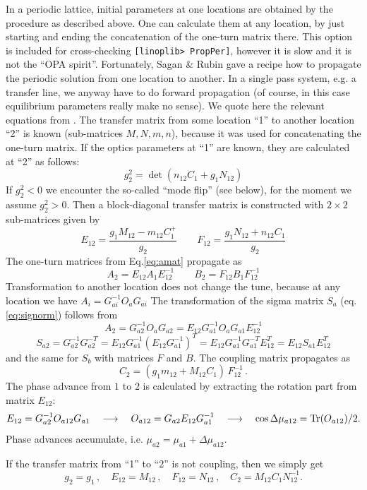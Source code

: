 \documentclass[12pt]{article}
\newcommand\beq{\begin{equation}}
\newcommand\eeq{\end{equation}}
\newcommand{\Tr}{{\rm Tr}}
\newcommand\code[1]{{\tt [#1]}}
\begin{document}
In a periodic lattice, initial parameters at one locations are obtained by the procedure as described above. One can calculate them at any location, by just starting and ending the concatenation of the one-turn matrix there. This option is included for cross-checking \code{linoplib> PropPer}, however it is slow and it is not the ``OPA spirit''.
Fortunately, Sagan \& Rubin gave a recipe \cite{SAGAN} how to propagate the periodic solution from one location to another.
In a single pass system, e.g. a transfer line, we anyway have to do forward propagation (of course, in this case equilibrium parameters really make no sense).
We quote here the relevant equations from \cite{SAGAN}. The transfer matrix from some location ``1'' to another location ``2'' is known (sub-matrices $M,N,m,n$), because it was used for concatenating the one-turn matrix. If the optics parameters at ``1'' are known, they are calculated at ``2'' as follows:
\beq\label{eq:g2noflip}
g_2^2=\det (n_{12} C_1+g_1 N_{12})
\eeq
If $g_2^2<0$ we encounter the so-called ``mode flip'' (see below), for the moment we assume $g_2^2>0$. Then a block-diagonal transfer matrix is constructed with $2\times 2$ sub-matrices given by
\beq
E_{12}=\frac{g_1M_{12}-m_{12}C_1^+}{g_2}\qquad
F_{12}=\frac{g_1N_{12}+n_{12}C_1}{g_2}
\eeq
The one-turn matrices from Eq.\ref{eq:amat} propagate as
\beq
A_2=E_{12}A_1 E_{12}^{-1}\qquad  B_2=F_{12}B_1 F_{12}^{-1}
\eeq
Transformation to another location does not change the tune, because at any location we have
$A_i = {G}_{ai}^{-1} {O}_a {G}_{ai}$
The transformation of the sigma matrix $S_a$ (eq.\ref{eq:signorm}) follows from
\beq
A_2 = {G}_{a2}^{-1} {O}_a {G}_{a2} = E_{12} {G}_{a1}^{-1} {O}_a {G}_{a1} E_{12}^{-1}
\eeq
\beq
S_{a2} =  {G}_{a2}^{-1} {G}_{a2}^{-T}
= E_{12} {G}_{a1}^{-1} (E_{12} {G}_{a1}^{-1})^T
=E_{12} {G}_{a1}^{-1} {G}_{a1}^{-T} E_{12}^T = E_{12} S_{a1} E_{12}^T
\eeq
and the same for $S_b$ with matrices $F$ and ${B}$.
The coupling matrix propagates as
\beq
C_2=(g_1m_{12}+M_{12}C_1)\,F_{12}^{-1}\, .
\eeq
The phase advance from $1$ to $2$ is calculated by extracting the rotation part from matrix $E_{12}$:
\beq
E_{12} = {G}_{a2}^{-1} {O}_{a12} {G}_{a1}\quad\longrightarrow\quad
{O}_{a12} = {G}_{a2} E_{12} {G}_{a1}^{-1} \quad\longrightarrow\quad \cos\Delta\mu_{a12}={\Tr}({O}_{a12})/2.
\eeq
Phase advances accumulate, i.e. $\mu_{a2}=\mu_{a1}+\Delta\mu_{a12}$.

If the transfer matrix from ``1'' to ``2'' is not coupling, then we simply get
\beq
g_2=g_1\,,\quad E_{12}=M_{12}\,, \quad  F_{12}=N_{12}\,, \quad C_2=M_{12}C_1N_{12}^{-1}.
\eeq
\\
\end{document}

